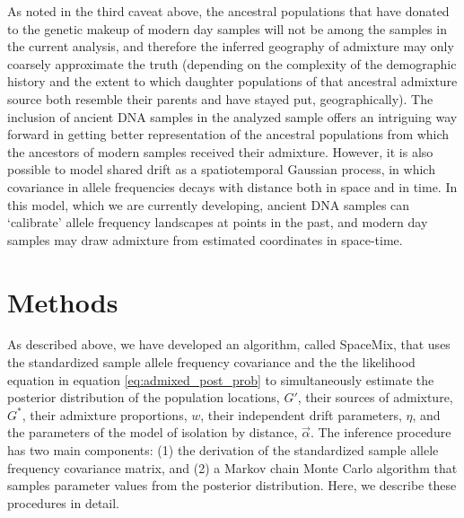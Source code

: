 \documentclass[12pt]{article}
\newcommand{\identifyadmixsource}[1]{{#1^{*}}}
\begin{document}
As noted in the third caveat above, the ancestral populations that have donated to the genetic makeup of modern day samples will not be among the samples in the current analysis, and therefore the inferred geography of admixture may only coarsely approximate the truth (depending on the complexity of the demographic history and the extent to which daughter populations of that ancestral admixture source both resemble their parents and have stayed put, geographically).  The inclusion of ancient DNA samples in the analyzed sample offers an intriguing way forward in getting better representation of the ancestral populations from which the ancestors of modern samples received their admixture.  However, it is also possible to model shared drift as a spatiotemporal Gaussian process, in which covariance in allele frequencies decays with distance both in space and in time.  In this model, which we are currently developing, ancient DNA samples can `calibrate' allele frequency landscapes at points in the past, and modern day samples may draw admixture from estimated coordinates in space-time.

\section*{Methods}
As described above, we have developed an algorithm, called SpaceMix, that uses the standardized sample allele frequency covariance and the the likelihood equation in equation \eqref{eq:admixed_post_prob} to simultaneously estimate the posterior distribution of the population locations, $G'$, their sources of admixture, $\identifyadmixsource{G}$, their admixture proportions, $w$, their independent drift parameters, $\eta$, and the parameters of the model of isolation by distance, $\vec{\alpha}$.  The inference procedure has two main components: (1) the derivation of the standardized sample allele frequency covariance matrix, and (2) a Markov chain Monte Carlo algorithm that samples parameter values from the posterior distribution.  Here, we describe these procedures in detail.
\end{document}
